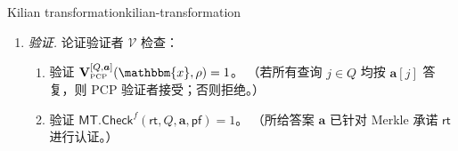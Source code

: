 \documentclass[american,singlepageview]{snargs-book-zh}
\renewcommand{\vec}[1]{\bm{#1}}
\newcommand{\Instance}{\mathbbm{x}}
\newcommand{\ProtoVerifier}{V}
\newcommand{\PCPSubscript}{\scriptscriptstyle\mathrm{PCP}}
\newcommand{\PCPFormat}[1]{\mathbf{#1}}
\newcommand{\PCPVerifier}{\PCPFormat{\ProtoVerifier}_{\PCPSubscript}}
\newcommand{\PCPEntry}{a}
\newcommand{\PCPEntries}{\vec{\PCPEntry}}
\newcommand{\PCPQueryIndex}{j}
\newcommand{\PCPQuerySet}{Q}
\newcommand{\PCPVerifierRandomMessage}{\rho}
\newcommand{\PCPLocalView}[2]{[#1,#2]}
\newcommand{\ARGFormat}[1]{\mathcal{#1}}
\newcommand{\ARGVerifier}{\ARGFormat{\ProtoVerifier}}
\newcommand{\ROFunction}{f}
\newcommand{\MTSymbol}{\mathsf{MT}}
\newcommand{\MTCheck}{\MTSymbol.\mathsf{Check}}
\newcommand{\MTCommitment}{\mathsf{rt}}
\newcommand{\MTProof}{\mathsf{pf}}
\newcommand{\KilianText}{Kilian transformation\xspace}
\begin{document}
\begin{ImportantConstruction}{\KilianText}{kilian-transformation}
\begin{enumerate}
\item \emph{验证.}
  论证验证者 $\ARGVerifier$ 检查：
  \begin{enumerate}[nolistsep]
    \item 验证
      \(\PCPVerifier^{\PCPLocalView{\PCPQuerySet}{\PCPEntries}}(\Instance,\PCPVerifierRandomMessage)=1\)。
      （若所有查询 \(\PCPQueryIndex\in\PCPQuerySet\) 均按 \(\PCPEntries[\PCPQueryIndex]\)
       答复，则 PCP 验证者接受；否则拒绝。）
    \item 验证
      \(\MTCheck^{\ROFunction}(\MTCommitment,\PCPQuerySet,\PCPEntries,\MTProof)=1\)。
      （所给答案 \(\PCPEntries\) 已针对 Merkle 承诺 \(\MTCommitment\) 进行认证。）
  \end{enumerate}

\end{enumerate}
\end{ImportantConstruction}
\end{document}
